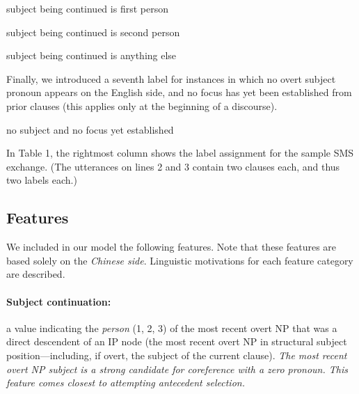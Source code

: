 \documentclass[11pt]{report}
\begin{document}
\begin{description} \itemsep1pt \parskip0pt 
\item[1h:] subject being continued is first person
\item[2h:] subject being continued is second person
\item[3h:] subject being continued is anything else 
\end{description}
Finally, we introduced a seventh label for instances in which no overt subject pronoun appears on the English side, and no focus has yet been established from prior clauses (this applies only at the beginning of a discourse). 
\begin{description} \itemsep1pt \parskip0pt 
\item[None:] no subject and no focus yet established
\end{description}
In Table 1, the rightmost column shows the label assignment for the sample SMS exchange. (The utterances on lines 2 and 3 contain two clauses each, and thus two labels each.)

\subsection{Features}\label{features}
We included in our model the following features. Note that these features are based solely on the \emph{Chinese side}. Linguistic motivations for each feature category are described.
\paragraph{Subject continuation:} a value indicating the \emph{person} (1, 2, 3) of the most recent overt NP that was a direct descendent of an IP node (the most recent overt NP in structural subject position---including, if overt, the subject of the current clause).  \emph{The most recent overt NP subject is a strong candidate for coreference with a zero pronoun. This feature comes closest to attempting antecedent selection.}
\vspace{-0.5em}
\end{document}
